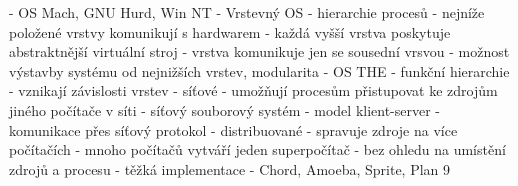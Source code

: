     - OS Mach, GNU Hurd, Win NT
- Vrstevný OS
    - hierarchie procesů
        - nejníže položené vrstvy komunikují s hardwarem
        - každá vyšší vrstva poskytuje abstraktnější virtuální stroj
        - vrstva komunikuje jen se sousední vrsvou
        - možnost výstavby systému od nejnižších vrstev, modularita
        - OS THE
    - funkční hierarchie
        - vznikají závislosti vrstev
- síťové
    - umožňují procesům přistupovat ke zdrojům jiného počítače v síti
    - síťový souborový systém
    - model klient-server
    - komunikace přes síťový protokol
- distribuované 
    - spravuje zdroje na více počítačích
    - mnoho počítačů vytváří jeden superpočítač
    - bez ohledu na umístění zdrojů a procesu
    - těžká implementace
    - Chord, Amoeba, Sprite, Plan 9

